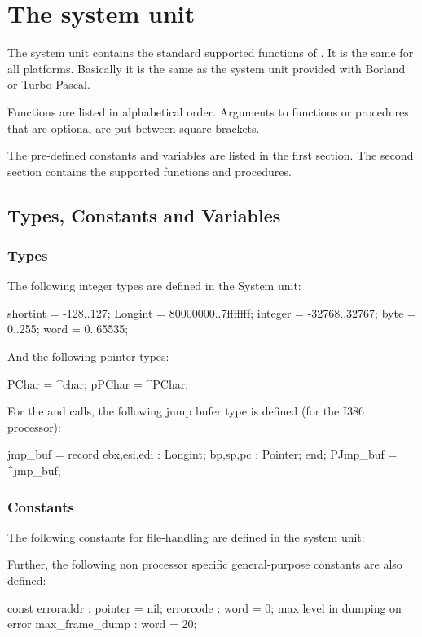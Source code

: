 \documentclass{report}
\begin{document}
\chapter{The system unit}
\label{ch:refchapter}

The system unit contains the standard supported functions of \fpc. It is the
same for all platforms. Basically it is the same as the system unit provided
with Borland or Turbo Pascal. 

Functions are listed in alphabetical order.
Arguments to functions or procedures that are optional are put between
square brackets.

The pre-defined constants and variables are listed in the first section. The
second section contains the supported functions and procedures.
\section{Types, Constants and Variables}
\subsection{Types}
The following integer types are defined in the System unit:
\begin{listing}
shortint = -128..127;
Longint  = $80000000..$7fffffff;
integer  = -32768..32767;
byte     = 0..255;
word     = 0..65535;
\end{listing}


And the following pointer types:
\begin{listing}
  PChar = ^char;
  pPChar = ^PChar;
\end{listing}

For the  and  calls, the following jump bufer
type is defined (for the I386 processor): 
\begin{listing}
  jmp_buf = record
    ebx,esi,edi : Longint;
    bp,sp,pc : Pointer;
    end;
  PJmp_buf = ^jmp_buf;
\end{listing}

\subsection{Constants}
The following constants for file-handling are defined in the system unit:
Further, the following non processor specific general-purpose constants
are also defined:
\begin{listing} 
const
  erroraddr : pointer = nil;
  errorcode : word = 0;
 { max level in dumping on error }
  max_frame_dump : word = 20;
\end{listing}
\end{document}
